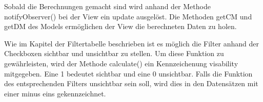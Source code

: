 Sobald die Berechnungen gemacht sind wird anhand der Methode notifyObserver() bei der View ein update ausgelöst. Die Methoden getCM und getDM des Models ermöglichen der View die berechneten Daten zu holen.

Wie im Kapitel der Filtertabelle beschrieben ist es möglich die Filter anhand der Checkboxen sichtbar und unsichtbar zu stellen. Um diese Funktion zu gewährleisten, wird der Methode calculate() ein Kennzeichenung visability mitgegeben. Eine 1 bedeutet sichtbar und eine 0 unsichtbar. Falls die Funktion des entsprechenden Filters unsichtbar sein soll, wird dies in den Datensätzen mit einer minus eins gekennzeichnet. 

